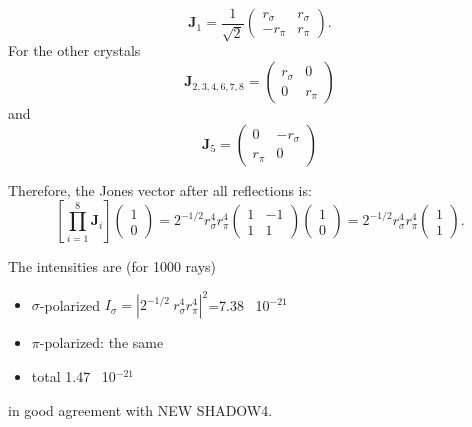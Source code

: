 \documentclass{iucr}
\begin{document}
\begin{equation}\label{eq:Jcase1_xtal1_S4}
    \textbf{J}_1=
    \frac{1}{\sqrt{2}}
    \begin{pmatrix}
r_\sigma  &
r_\sigma \\
- r_\pi& 
r_\pi
\end{pmatrix} 
.
\end{equation}
For the other crystals
\begin{equation}\label{eq:Jcase1_S4}
\textbf{J}_{2,3,4,6,7,8}=
    \begin{pmatrix}
r_\sigma & 0\\
0& 
r_\pi
\end{pmatrix}
\end{equation}
and
\begin{equation}\label{eq:J5case1_S4}
\textbf{J}_{5}=
\begin{pmatrix}
0 & -r_\sigma\\
r_\pi& 0
\end{pmatrix}
\end{equation}

Therefore, the Jones vector after all reflections is:
\begin{equation}\label{eq:JVcase1_S4}
\left[ \prod_{i=1}^{8} \textbf{J}_i \right]
    \begin{pmatrix}
    1\\0
    \end{pmatrix}=
    2^{-1/2} r_\sigma^4 r_\pi^4
        \begin{pmatrix}
   1&-1\\
    1 & 1
    \end{pmatrix}
        \begin{pmatrix}
    1\\0
    \end{pmatrix}
    =
    2^{-1/2}r_\sigma^4 r_\pi^4
    \begin{pmatrix}
    1\\
    1
    \end{pmatrix}.
\end{equation}

The intensities are (for 1000 rays)
\begin{itemize}
    \item $\sigma$-polarized $I_\sigma=|2^{-1/2}~r_\sigma^4 r_\pi^4|^2$=7.38~ 10$^{-21}$
    \item $\pi$-polarized: the same 
    \item total 1.47~ 10$^{-21}$
\end{itemize}
in good agreement with NEW SHADOW4.
\end{document}
